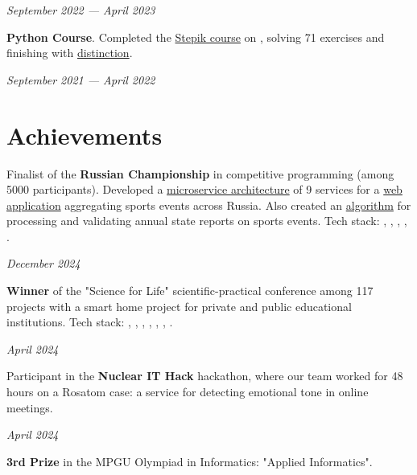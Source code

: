 \documentclass[margin,line]{resume}
\begin{document}
\begin{resume}
  \hfill \textsl{September 2022 — April 2023}

  \textbf{Python Course}. Completed the
  \href{https://stepik.org/course/67}{Stepik course} on
  , solving 71 exercises and finishing with
  \href{https://github.com/alchemmist/CV/blob/main/attachments/stepik-python-course.pdf}{distinction}.

  \vspace{-7mm}

  \hfill \textsl{September 2021 — April 2022}

  \section{\mysidestyle Achievements}
  Finalist of the \textbf{Russian Championship} in competitive
  programming (among 5000 participants). Developed a
  \href{https://github.com/alchemmist/CV/blob/main/attachments/architect.pdf}{microservice
  architecture} of 9 services for a
  \href{https://github.com/alchemmist/sportprog}{web application}
  aggregating sports events across Russia. Also created an
  \href{https://github.com/alchemmist/sport-afisha/blob/main/event_parsing_service/parse_pdf.py}{algorithm}
  for processing and validating annual state reports on sports
  events. Tech stack: , ,
  , , .

  \vspace{-6mm}

  \hfill \textsl{December 2024}

  \textbf{Winner} of the "Science for Life" scientific-practical
  conference among 117 projects with a smart home project for private
  and public educational institutions. Tech stack:
  , ,
  , , ,
  , .
  \vspace{-6mm}

  \hfill \textsl{April 2024}

  Participant in the \textbf{Nuclear IT Hack} hackathon, where our
  team worked for 48 hours on a Rosatom case: a service for detecting
  emotional tone in online meetings.

  \vspace{-7mm}

  \hfill \textsl{April 2024}

  \textbf{3rd Prize} in the MPGU Olympiad in Informatics: "Applied Informatics".
  \vspace{-2mm}


\end{resume}
\end{document}
